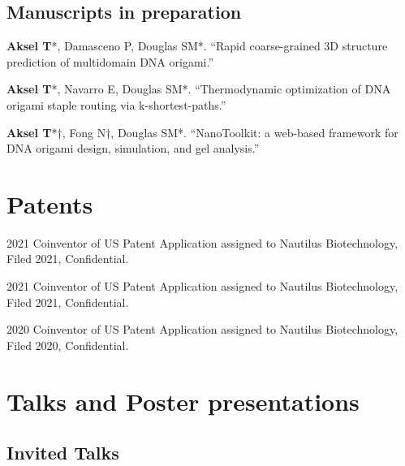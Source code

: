 \documentclass[12pt,letterpaper]{report}
\begin{document}
    \subsection*{Manuscripts in preparation}

    \begin{tablist}

        \item[\the\year] \tab{}\textbf{Aksel T}*, Damasceno P, Douglas SM*. \enquote{Rapid coarse-grained 3D structure prediction of multidomain DNA origami.}

        \item[\the\year] \tab{}\textbf{Aksel T}*, Navarro E, Douglas SM*. \enquote{Thermodynamic optimization of DNA origami staple routing via k-shortest-paths.}

        \item[\the\year] \tab{}\textbf{Aksel T}*†, Fong N†, Douglas SM*. \enquote{NanoToolkit: a web-based framework for DNA origami design, simulation, and gel analysis.}

    \end{tablist}
    
    \section*{Patents}

    \begin{tablist}

        \item[2021] \tab{}Coinventor of US Patent Application assigned to Nautilus Biotechnology, Filed 2021, Confidential.
        \item[2021] \tab{}Coinventor of US Patent Application assigned to Nautilus Biotechnology, Filed 2021, Confidential.
        \item[2020] \tab{}Coinventor of US Patent Application assigned to Nautilus Biotechnology, Filed 2020, Confidential.

    \end{tablist}

    \section*{Talks and Poster presentations}

    \subsection*{Invited Talks}
\end{document}
